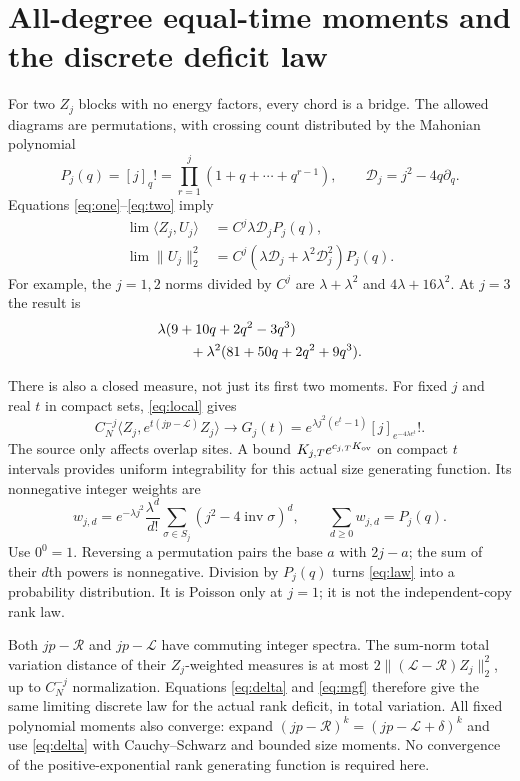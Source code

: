 \documentclass[11pt]{article}
\newcommand{\RR}{\mathcal R}
\newcommand{\LL}{\mathcal L}
\newcommand{\inv}{\operatorname{inv}}
\begin{document}
\newpage
\section{All-degree equal-time moments and the discrete deficit law}
For two $Z_j$ blocks with no energy factors, every chord is a bridge.
The allowed diagrams are permutations, with crossing count distributed
by the Mahonian polynomial
\begin{equation}
 P_j(q)=[j]_q!=\prod_{r=1}^j(1+q+\cdots+q^{r-1}),
 \qquad \mathscr D_j=j^2-4q\partial_q.
\end{equation}
Equations \eqref{eq:one}--\eqref{eq:two} imply
\begin{align}
 \lim\langle Z_j,U_j\rangle&=C^j\lambda\mathscr D_jP_j(q),\\
 \lim\|U_j\|_2^2&=C^j(\lambda\mathscr D_j+
                       \lambda^2\mathscr D_j^2)P_j(q).\label{eq:norm}
\end{align}
For example, the $j=1,2$ norms divided by $C^j$ are
$\lambda+\lambda^2$ and $4\lambda+16\lambda^2$.
At $j=3$ the result is
\begin{align}
 &\lambda(9+10q+2q^2-3q^3)\notag\\
 &\hspace{8mm}+\lambda^2(81+50q+2q^2+9q^3).
\end{align}

There is also a closed measure, not just its first two moments.
For fixed $j$ and real $t$ in compact sets, \eqref{eq:local} gives
\begin{equation}
 C_N^{-j}\langle Z_j,e^{t(jp-\LL)}Z_j\rangle
 \longrightarrow G_j(t)=
 e^{\lambda j^2(e^t-1)}[j]_{e^{-4\lambda e^t}}! .\label{eq:mgf}
\end{equation}
The source only affects overlap sites. A bound
$K_{j,T}e^{c_{j,T}K_{\rm ov}}$ on compact $t$ intervals provides
uniform integrability for this actual size generating function.
Its nonnegative integer weights are
\begin{equation}
 w_{j,d}=e^{-\lambda j^2}\frac{\lambda^d}{d!}
     \sum_{\sigma\in S_j}(j^2-4\inv\sigma)^d,
 \qquad \sum_{d\ge0}w_{j,d}=P_j(q).\label{eq:law}
\end{equation}
Use $0^0=1$. Reversing a permutation pairs the base $a$ with $2j-a$;
the sum of their $d$th powers is nonnegative. Division by $P_j(q)$
turns \eqref{eq:law} into a probability distribution. It is Poisson
only at $j=1$; it is not the independent-copy rank law.

Both $jp-\RR$ and $jp-\LL$ have commuting integer spectra.
The sum-norm total variation distance of their $Z_j$-weighted measures
is at most $2\|(\LL-\RR)Z_j\|_2^2$, up to $C_N^{-j}$ normalization.
Equations \eqref{eq:delta} and \eqref{eq:mgf} therefore give the same
limiting discrete law for the actual rank deficit, in total variation.
All fixed polynomial moments also converge: expand
$(jp-\RR)^k=(jp-\LL+\delta)^k$ and use \eqref{eq:delta} with
Cauchy--Schwarz and bounded size moments. No convergence of the
positive-exponential rank generating function is required here.
\end{document}
